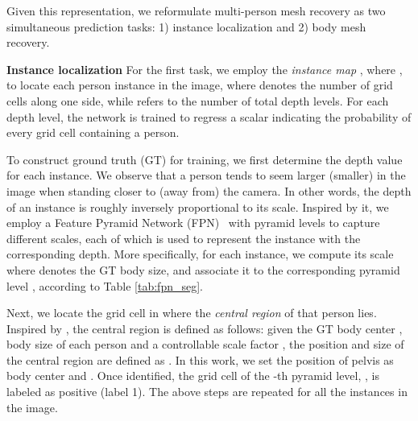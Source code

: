 \documentclass[final]{cvpr}
\newcommand{\myparagraph}[1]{{ \noindent \bf #1}}
\begin{document}
Given this representation, we reformulate multi-person mesh recovery as two simultaneous prediction tasks: 1) instance localization and 2) body mesh recovery.


\myparagraph{Instance localization}
For the first task, we employ the \textit{instance map} , where , to locate each person instance in the image, where  denotes the number of grid cells along one side, while  refers to the number of total depth levels.
For each depth level, the network is trained to regress a scalar indicating the probability of every grid cell containing a person.

To construct ground truth (GT) for training, we
first determine the depth value  for each instance.
We observe that a person tends to seem larger (smaller) in the image when standing closer to (away from) the camera. 
In other words, the depth of an instance is roughly inversely proportional to its scale.
Inspired by it, we employ a Feature Pyramid Network (FPN)~\cite{lin2017feature} with  pyramid levels to capture  different scales, each of which is used to represent the instance with the corresponding depth. 
More specifically, for each instance, we compute its scale  where  denotes the GT body size, and associate it to the corresponding pyramid level , according to Table \ref{tab:fpn_seg}.

\begin{table}[h!]
    \centering
    \caption{We employ FPN with five pyramid levels. P is used to predict instance  and body mesh maps , where . 
    } 
     \label{tab:fpn_seg}
     \vspace{-2mm}
\end{table}

Next, we locate the grid cell  in  where the \textit{central region} of that person lies. 
Inspired by \cite{zhou2019objects,duan2019centernet}, the central region is defined as follows:
given the GT body center ,  body size  of each person and a controllable scale factor , the position and size of the central region are defined as . 
In this work, we set the position of pelvis as body center and .
Once identified, the grid cell  of the -th pyramid level, \ie,  is labeled as positive (label 1).
The above steps are repeated for all the instances in the image.
\end{document}
